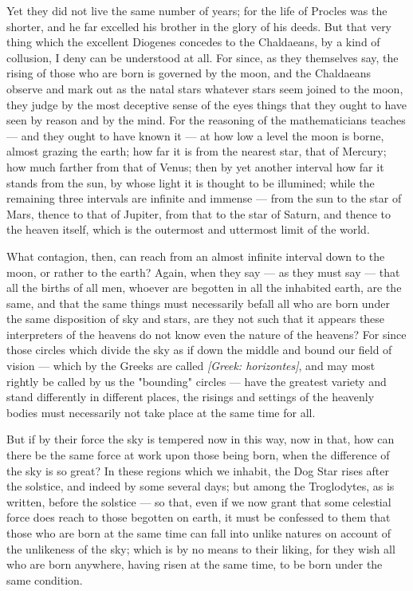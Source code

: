  Yet they did not live the same number of years; for the life of Procles was the shorter, and he far excelled his brother in the glory of his deeds. But that very thing which the excellent Diogenes concedes to the Chaldaeans, by a kind of collusion, I deny can be understood at all. For since, as they themselves say, the rising of those who are born is governed by the moon, and the Chaldaeans observe and mark out as the natal stars whatever stars seem joined to the moon, they judge by the most deceptive sense of the eyes things that they ought to have seen by reason and by the mind. For the reasoning of the mathematicians teaches — and they ought to have known it — at how low a level the moon is borne, almost grazing the earth; how far it is from the nearest star, that of Mercury; how much farther from that of Venus; then by yet another interval how far it stands from the sun, by whose light it is thought to be illumined; while the remaining three intervals are infinite and immense — from the sun to the star of Mars, thence to that of Jupiter, from that to the star of Saturn, and thence to the heaven itself, which is the outermost and uttermost limit of the world.

 What contagion, then, can reach from an almost infinite interval down to the moon, or rather to the earth? Again, when they say — as they must say — that all the births of all men, whoever are begotten in all the inhabited earth, are the same, and that the same things must necessarily befall all who are born under the same disposition of sky and stars, are they not such that it appears these interpreters of the heavens do not know even the nature of the heavens? For since those circles which divide the sky as if down the middle and bound our field of vision — which by the Greeks are called \textit{[Greek: horizontes]}, and may most rightly be called by us the "bounding" circles — have the greatest variety and stand differently in different places, the risings and settings of the heavenly bodies must necessarily not take place at the same time for all.

 But if by their force the sky is tempered now in this way, now in that, how can there be the same force at work upon those being born, when the difference of the sky is so great? In these regions which we inhabit, the Dog Star rises after the solstice, and indeed by some several days; but among the Troglodytes, as is written, before the solstice — so that, even if we now grant that some celestial force does reach to those begotten on earth, it must be confessed to them that those who are born at the same time can fall into unlike natures on account of the unlikeness of the sky; which is by no means to their liking, for they wish all who are born anywhere, having risen at the same time, to be born under the same condition.

